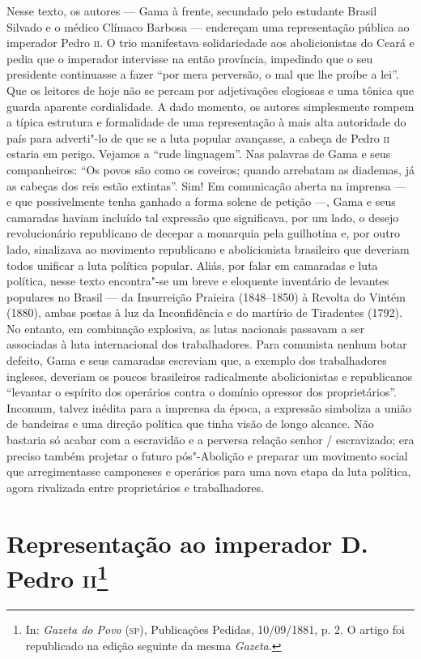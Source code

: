 {\small\noindent
Nesse texto, os autores --- Gama à frente, secundado pelo estudante
Brasil Silvado e o médico Clímaco Barbosa --- endereçam uma representação
pública ao imperador Pedro \textsc{ii}. O trio manifestava solidariedade aos
abolicionistas do Ceará e pedia que o imperador intervisse na então
província, impedindo que o seu presidente continuasse a fazer ``por mera
perversão, o mal que lhe proíbe a lei''. Que os leitores de hoje não se
percam por adjetivações elogiosas e uma tônica que guarda aparente
cordialidade. A dado momento, os autores simplesmente rompem a típica
estrutura e formalidade de uma representação à mais alta autoridade do
país para adverti"-lo de que se a luta popular avançasse, a cabeça de
Pedro \textsc{ii} estaria em perigo. Vejamos a ``rude linguagem''. Nas palavras de Gama e seus
companheiros: ``Os povos são como os coveiros; quando arrebatam as
diademas, já as cabeças dos reis estão extintas''. Sim! Em comunicação
aberta na imprensa --- e que possivelmente tenha ganhado a forma solene
de petição ---, Gama e seus camaradas haviam incluído tal expressão que
significava, por um lado, o desejo revolucionário republicano de decepar
a monarquia pela guilhotina e, por outro lado, sinalizava ao movimento republicano e
abolicionista brasileiro que deveriam todos unificar a luta política
popular. Aliás, por falar em camaradas e luta política, nesse texto
encontra"-se um breve e eloquente inventário de levantes populares no
Brasil --- da Insurreição Praieira (1848--1850) à Revolta do Vintém
(1880), ambas postas à luz da Inconfidência e do martírio de Tiradentes
(1792). No entanto, em combinação explosiva, as lutas nacionais passavam
a ser associadas à luta internacional dos trabalhadores. Para comunista
nenhum botar defeito, Gama e seus camaradas escreviam que, a exemplo dos
trabalhadores ingleses, deveriam os poucos brasileiros radicalmente
abolicionistas e republicanos ``levantar o espírito dos operários contra
o domínio opressor dos proprietários''. Incomum, talvez inédita para a
imprensa da época, a expressão simboliza a união de bandeiras e uma
direção política que tinha visão de longo alcance. Não bastaria só
acabar com a escravidão e a perversa relação senhor / escravizado; era
preciso também projetar o futuro pós"-Abolição e preparar um movimento
social que arregimentasse camponeses e operários para uma nova etapa da
luta política, agora rivalizada entre proprietários e trabalhadores. }

\chapter{Representação ao imperador D.\,Pedro \textsc{ii}\footnote[*]{In:
  \emph{Gazeta do Povo} (\textsc{sp}), Publicações Pedidas, 10/09/1881, p. 2. O
  artigo foi republicado na edição seguinte da mesma \emph{Gazeta}.}}

